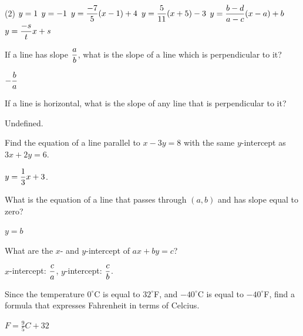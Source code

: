 \documentclass[12pt,fleqn]{book}
\newcommand{\prb}[1]{\begin{Exercise}#1\end{Exercise}}
\newcommand{\sol}[1]{\begin{Answer}#1\end{Answer}}
\begin{document}
\sol{\
	\begin{tasks}(2)
		\task $\displaystyle y=1$
		\task $\displaystyle y=-1$
		\task $\displaystyle y=\frac{-7}{5}(x-1)+4$
		\task $\displaystyle y=\frac{5}{11}(x+5)-3$
		\task $\displaystyle y=\frac{b-d}{a-c}(x-a)+b$
		\task $\displaystyle y=\frac{-s}{t}x+s$
	\end{tasks}
}

\prb{
	If a line has slope $\displaystyle \frac ab$, what is the slope of a line which is perpendicular to it?
	\vspace{4em}
}
\sol{$\displaystyle -\frac ba$}
\prb{
	If a line is horizontal, what is the slope of any line that is perpendicular to it?
	\vspace{4em}
}
\sol{
	Undefined.
}
\prb{ Find the equation of a line parallel to $x-3y=8$ with the same $y$-intercept as $3x+2y=6$.}
\vspace{4em}
\sol{ $\displaystyle y=\frac{1}{3}x+3$. }

\prb{
	What is the equation of a line that passes through $(a,b)$ and has slope equal to zero?
	\vspace{4em}
}
\sol{$y=b$}
\prb{
	What are the $x$- and $y$-intercept of $ax+by=c$?
	\vspace{4em}
}
\sol{$x$-intercept: $\displaystyle\frac ca$, $y$-intercept: $\displaystyle\frac cb$.}

\prb{
	Since the temperature $0^\circ$C is equal to $32^\circ$F, and $-40^\circ$C is equal to $-40^\circ$F, find a formula that expresses Fahrenheit in terms of Celcius.
	\vspace{4em}
}
\sol{$F=\frac{9}{5}C+32$}

\clearpage
\end{document}
